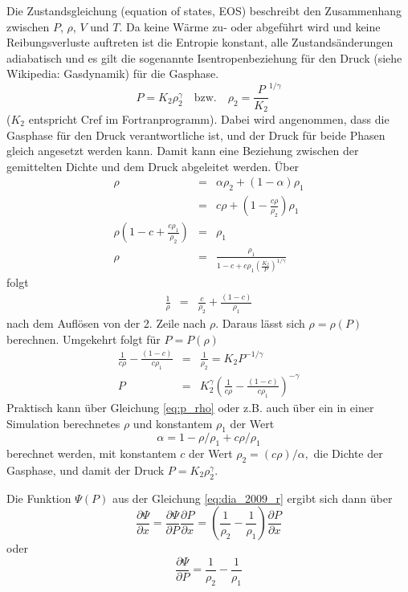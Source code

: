 Die Zustandsgleichung (equation of states, EOS) beschreibt den
Zusammenhang zwischen $P$, $\rho$, $V$ und $T$.  Da keine Wärme zu-
oder abgeführt wird und keine Reibungsverluste auftreten ist die
Entropie konstant, alle Zustandsänderungen adiabatisch und es gilt die
sogenannte Isentropenbeziehung für den Druck (siehe Wikipedia:
Gasdynamik) für die Gasphase.
\begin{equation}
P = K_2 \rho_2^\gamma \quad\mbox{bzw.}\quad \rho_2 =
\frac{P}{K_2}^{1/\gamma} \label{eq:gas_druck}
\end{equation}
($K_2$ entspricht Cref im Fortranprogramm).  Dabei wird angenommen,
dass die Gasphase für den Druck verantwortliche ist, und der Druck für
beide Phasen gleich angesetzt werden kann. Damit kann eine Beziehung
zwischen der gemittelten Dichte und dem Druck abgeleitet werden. Über
\begin{eqnarray}
  \rho &=& \alpha \rho_2 + (1-\alpha) \rho_1\nonumber \\
  &=& c \rho + (1-\frac{c \rho }{\rho_2})\rho_1\nonumber \\
  \rho \left(1-c+ \frac{c \rho_1}{\rho_2}   \right) &=& \rho_1\\
\rho &=& \frac{\rho_1}{1-c+c\rho_1 \left(\frac{K_2}{P}\right)
  ^{1/\gamma} }\label{eq:rho_p}
\end{eqnarray}
folgt
\begin{eqnarray}
\frac{1}{\rho} &=& \frac{c}{\rho_2} + \frac{(1-c)}{\rho_1} \label{eq:rhos}
\end{eqnarray}
nach dem Auflösen von der 2. Zeile nach $\rho$. Daraus lässt sich
$\rho = \rho(P)$ berechnen. Umgekehrt folgt für $P = P(\rho)$
\begin{eqnarray}
\frac{1}{c\rho} - \frac{(1-c)}{c\rho_1} &=& \frac{1}{\rho_2} =
K_2 P^{-1/\gamma}\nonumber \\
P &=& K_2^{\gamma}\left(\frac{1}{c\rho} - \frac{(1-c)}{c\rho_1}
\right)^{-\gamma} \label{eq:p_rho}
\end{eqnarray}
Praktisch kann über Gleichung \ref{eq:p_rho} oder z.B. auch über ein
in einer Simulation berechnetes $\rho$ und konstantem $\rho_1$ der
Wert
\[
\alpha = 1 - \rho/\rho_1 + c\rho/\rho_1
\]
berechnet werden, mit konstantem $c$ der Wert $\rho_2 =
(c\rho)/\alpha,$ die Dichte der Gasphase, und damit der Druck $P = K_2
\rho_2^\gamma$.

Die Funktion $\Psi(P)$ aus der Gleichung \ref{eq:dia_2009_r} ergibt
sich dann über
\[
\frac{\partial \Psi}{\partial x} = \frac{\partial \Psi}{\partial
  P}\frac{\partial P}{\partial x} =
\left(\frac{1}{\rho_2}-\frac{1}{\rho_1}\right)\frac{\partial
  P}{\partial x}
\]
oder 
\begin{equation}
\frac{\partial \Psi}{\partial P} =
\frac{1}{\rho_2}-\frac{1}{\rho_1}\label{eq:abl_Psi}
\end{equation}

